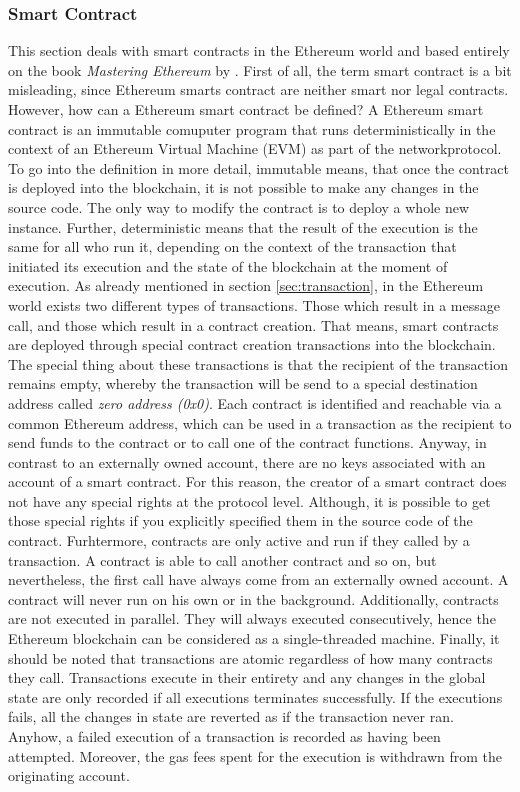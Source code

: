 \subsubsection{Smart Contract}
\label{sec:smart_contract}
This section deals with smart contracts in the Ethereum world and based 
entirely on the book \textit{Mastering Ethereum} by .
First of all, the term smart contract is a bit misleading, since Ethereum smarts contract 
are neither smart nor legal contracts. However, how can a Ethereum smart contract be defined?
A Ethereum smart contract is an immutable comuputer program that runs deterministically in the context of an
Ethereum Virtual Machine (EVM) as part of the networkprotocol. To go into the definition in more detail, 
immutable means, that once the contract is deployed into the blockchain, it is not possible to make any
changes in the source code. The only way to modify the contract is to deploy a whole new instance. 
Further, deterministic means that the result of the execution is the same for all who run it, 
depending on the context of the transaction that initiated its execution and the state of the blockchain
at the moment of execution.
As already mentioned in section \ref{sec:transaction}, in the Ethereum world exists two different types of transactions.
Those which result in a message call, and those which result in a contract creation. 
That means, smart contracts are deployed through special contract creation transactions into the blockchain. 
The special thing about these transactions is that the recipient of the transaction remains empty, whereby the transaction
will be send to a special destination address called \textit{zero address (0x0)}. Each contract is identified and reachable via
a common Ethereum address, which can be used in a transaction as the recipient to send funds to the contract or to call 
one of the contract functions. Anyway, in contrast to an externally owned account, there are no keys associated with 
an account of a smart contract. For this reason, the creator of a smart contract does not have any special rights at the 
protocol level. Although, it is possible to get those special rights if you explicitly 
specified them in the source code of the contract.
Furhtermore, contracts are only active and run if they called by a transaction. 
A contract is able to call another contract and so on, but nevertheless, 
the first call have always come from an externally owned account. 
A contract will never run on his own or in the background. Additionally, contracts are not executed in parallel.
They will always executed consecutively, hence the Ethereum blockchain can be considered as a single-threaded machine. 
Finally, it should be noted that transactions are atomic regardless of how many contracts they call. Transactions execute in
their entirety and any changes in the global state are only recorded if all executions terminates successfully. 
If the executions fails, all the changes in state are reverted as if the transaction never ran. Anyhow, a failed
execution of a transaction is recorded as having been attempted. Moreover, the gas fees spent for the execution is withdrawn
from the originating account.

\clearpage